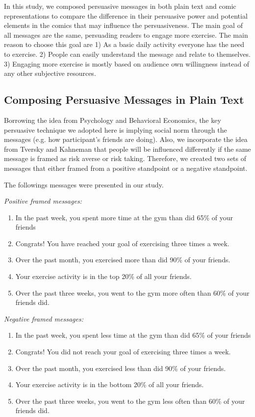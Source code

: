 In this study, we composed persuasive messages in both plain text and comic representations to compare the difference in their persuasive power and potential elements in the comics that may influence the persuasiveness. The main goal of all messages are the same, persuading readers to engage more exercise. The main reason to choose this goal are 1) As a basic daily activity everyone has the need to exercise. 2) People can easily understand the message and relate to themselves. 3) Engaging more exercise is mostly based on audience own willingness instead of any other subjective resources.\par
\subsection{Composing Persuasive Messages in Plain Text}
Borrowing the idea from Psychology and Behavioral Economics, the key persuasive technique we adopted here is implying social norm through the messages (e.g. how participant's friends are doing). Also, we incorporate the idea from Tversky and Kahneman that people will be influenced differently if the same message is framed as risk averse or risk taking. Therefore, we created two sets of messages that either framed from a positive standpoint or a negative standpoint. \par
The followings messages were presented in our study.\par
\textit{Positive framed messages:}
\begin{enumerate}
  \item In the past week, you spent more time at the gym than did 65\% of your friends
  \item Congrats! You have reached your goal of exercising three times a week.
  \item Over the past month, you exercised more than did 90\% of your friends.
  \item Your exercise activity is in the top 20\% of all your friends.
  \item Over the past three weeks, you went to the gym more often than 60\% of your friends did.
\end{enumerate}\par
\textit{Negative framed messages:}
\begin{enumerate}
\item	In the past week, you spent less time at the gym than did 65\% of your friends
\item Congrats! You did not reach your goal of exercising three times a week.
\item	Over the past month, you exercised less than did 90\% of your friends.
\item	Your exercise activity is in the bottom 20\% of all your friends.
\item	Over the past three weeks, you went to the gym less often than 60\% of your friends did.
\end{enumerate}\par
